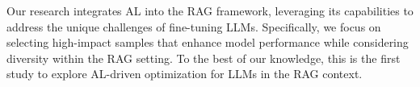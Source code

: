 Our research integrates AL into the RAG framework, leveraging its capabilities to address the unique challenges of fine-tuning LLMs. Specifically, we focus on selecting high-impact samples that enhance model performance while considering diversity within the RAG setting. To the best of our knowledge, this is the first study to explore AL-driven optimization for LLMs in the RAG context.